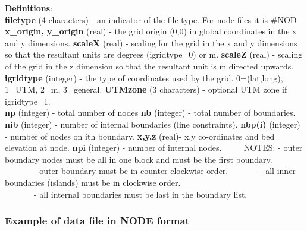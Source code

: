 \documentclass{article}
\begin{document}
\noindent\textbf{Definitions}:\\ 

\noindent
\textbf{filetype} (4 characters) - an indicator of the file type.  For node files it is \#NOD \newline
\textbf{x\_origin, y\_origin} (real) - the grid origin (0,0) in global coordinates in the x and y dimensions. \newline
\textbf{scaleX} (real) - scaling for the grid in the x and y dimensions so that the resultant units are degrees (igridtype=0) or m. \newline
\textbf{scaleZ} (real) - scaling of the grid in the z dimension so that the resultant unit is m directed upwards.  \newline
\textbf{igridtype} (integer) - the type of coordinates used by the grid. 0=(lat,long), 1=UTM, 2=m, 3=general. \newline
\textbf{UTMzone} (3 characters) - optional UTM zone if igridtype=1. \\
\textbf{np} (integer) - total number of nodes\newline
\textbf{nb} (integer) - total number of boundaries.\newline
\textbf{nib} (integer) - number of internal boundaries (line constraints).\newline
\textbf{nbp(i)} (integer) - number of nodes on ith boundary.\newline
\textbf{x,y,z} (real)- x,y co-ordinates and bed elevation at node.\newline
\textbf{npi} (integer) - number of internal nodes.\newline
 \ \ \ \ \newline
 NOTES: - outer boundary nodes must be all in one block and must be the first boundary.\newline
 \ \ \ \ \ \ \ {}- outer boundary must be in counter clockwise order.\newline
 \ \ \ \ \ \ \ {}- all inner boundaries (islands) must be in clockwise order.\\
\ \ \ \ \ \ \ {}- all internal boundaries must be last in the boundary list.


\subsubsection{Example of data file in NODE format}
\end{document}
